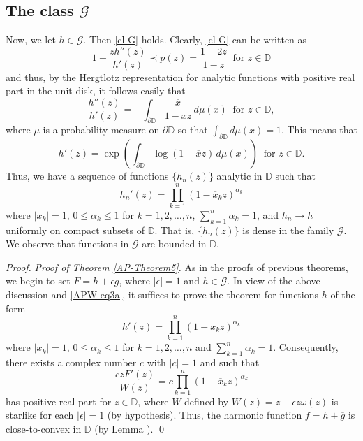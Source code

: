 \documentclass[a4paper,12pt]{amsart}
\theoremstyle{definition}
\newenvironment{pf}[1][]{ \vskip 3mm
 \noindent
 \ifthenelse{\equal{#1}{}}  {{\slshape Proof. }}  {{\slshape #1.} } }{\qed\bigskip}
\newcounter{tmp}
\begin{document}
\subsection{The class $\mathcal{G}$}

Now, we let $h\in\mathcal{G}$. Then \eqref{cl-G} holds. Clearly, \eqref{cl-G} can be written as
$$ 1+ \frac{zh''(z)}{h'(z)}\prec p(z)=\frac{1-2z}{1-z} ~\mbox{ for $z\in {{\mathbb D}}$}
$$
and thus, by the Hergtlotz representation for analytic functions with positive real part in the unit disk, it
follows easily that
$$\frac{h''(z)}{h' (z)} =- \int_{\partial {{\mathbb D}}}\frac{\overline{x}}{1-\overline{x}z }\,d\mu (x)~\mbox{ for $z\in {{\mathbb D}}$},
$$
where $\mu $ is a probability measure on $\partial {{\mathbb D}}$ so that $\int_{\partial {{\mathbb D}}} d\mu (x)=1$. This
means that
$$ h'(z)= \exp \left (\int_{\partial {{\mathbb D}}} \log (1-\overline{x}z )\,d\mu (x) \right )~\mbox{ for $z\in {{\mathbb D}}$}.
$$
Thus, we have a sequence of functions $\{h_n(z)\}$ analytic in ${{\mathbb D}}$ such that
\begin{equation}\label{APW-eq3a}
h_n'(z)= \prod _{k=1}^n(1-\overline{x}_{k}z)^{\alpha _k}
\end{equation}
where $|x_k|=1$, $0\leq \alpha _{k}\leq 1$ for $k=1,2,\ldots , n$, $\sum\limits_{k=1}^{n}\alpha _{k}=1$,
and $h_n{\rightarrow} h$ uniformly on compact subsets of ${{\mathbb D}}$. That is, $\{h_n(z)\}$ is dense in the family
${\mathcal G}.$ We observe that functions in ${\mathcal G}$ are bounded in ${{\mathbb D}}$.

\begin{pf}[Proof of Theorem \ref{AP-Theorem5}]
As in the proofs of previous theorems, we begin to set $F=h+\epsilon g$, where $|\epsilon|=1$ and $h\in {\mathcal G}.$
In view of the above discussion and \eqref{APW-eq3a}, it suffices to prove the theorem for
functions $h$ of the form
$$h'(z)= \prod _{k=1}^n(1-\overline{x}_{k}z)^{\alpha _k}
$$
where $|x_k|=1$, $0\leq \alpha _{k}\leq 1$ for $k=1,2,\ldots , n$ and $\sum\limits_{k=1}^{n}\alpha _{k}=1$.
Consequently, there exists a complex number $c$ with $|c|=1$ and such that
$$\frac{czF'(z)}{W(z)}=c\prod \limits_{k=1}^n(1-\overline{x}_{k}z)^{\alpha _k}
$$
has positive real part for $z\in{{\mathbb D}}$, where $W$ defined by $W(z)=z+\epsilon z\omega (z)$ is starlike for each $|\epsilon|=1$
(by hypothesis). Thus, the harmonic function $ f=h+\overline{g}$ is close-to-convex in ${{\mathbb D}}$ (by Lemma {}).
\end{pf}
\end{document}
